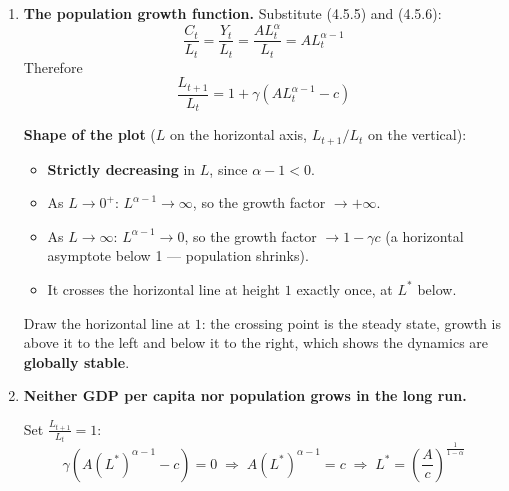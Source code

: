\documentclass[12pt, letterpaper]{article}
\newcommand{\stst}{^{\ast}}
\begin{document}
\begin{tcolorbox}[oddbox,title={Problem 4.5 \quad A Malthusian Model}]
\begin{enumerate}
\textbf{Why Malthus believed it.} Writing in 1798, he had in mind two mechanisms:
\begin{itemize}[leftmargin=1.3em,itemsep=2pt,topsep=2pt]
\item \textbf{Positive checks} operating below subsistence --- famine, disease and war raise
      the death rate, especially infant and child mortality.
\item \textbf{Preventive checks} operating above it --- prosperity brings earlier marriage
      and higher fertility; hardship delays marriage and reduces it.
\end{itemize}
This was an accurate description of pre-industrial demography, where fertility genuinely did
respond to harvests and real wages. Note the sharp contrast with Kurlat's \textbf{Assumption
4.5}, which makes $n$ exogenous --- the book flags in \S4.1 that this is ``actually a very
big deal'', and this exercise is where you see why.

\item \textbf{The population growth function.} Substitute (4.5.5) and (4.5.6):
$$\frac{C_t}{L_t} = \frac{Y_t}{L_t} = \frac{A L_t^{\alpha}}{L_t} = A L_t^{\alpha-1}$$
Therefore
$$\boxed{\;\frac{L_{t+1}}{L_t} = 1 + \gamma\left(A L_t^{\alpha-1} - c\right)\;}$$

\textbf{Shape of the plot} ($L$ on the horizontal axis, $L_{t+1}/L_t$ on the vertical):
\begin{itemize}[leftmargin=1.3em,itemsep=2pt,topsep=2pt]
\item \textbf{Strictly decreasing} in $L$, since $\alpha - 1 < 0$.
\item As $L \to 0^+$: $L^{\alpha-1}\to\infty$, so the growth factor $\to +\infty$.
\item As $L \to \infty$: $L^{\alpha-1}\to 0$, so the growth factor $\to 1 - \gamma c$
      (a horizontal asymptote below 1 --- population shrinks).
\item It crosses the horizontal line at height $1$ exactly once, at $L\stst$ below.
\end{itemize}
Draw the horizontal line at $1$: the crossing point is the steady state, growth is above it
to the left and below it to the right, which shows the dynamics are \textbf{globally stable}.

\item \textbf{Neither GDP per capita nor population grows in the long run.}

Set $\frac{L_{t+1}}{L_t} = 1$:
$$\gamma\left(A(L\stst)^{\alpha-1} - c\right) = 0
\;\Longrightarrow\; A (L\stst)^{\alpha-1} = c
\;\Longrightarrow\; \boxed{L\stst = \left(\frac{A}{c}\right)^{\frac{1}{1-\alpha}}}$$


\end{enumerate}
\end{tcolorbox}
\end{document}
